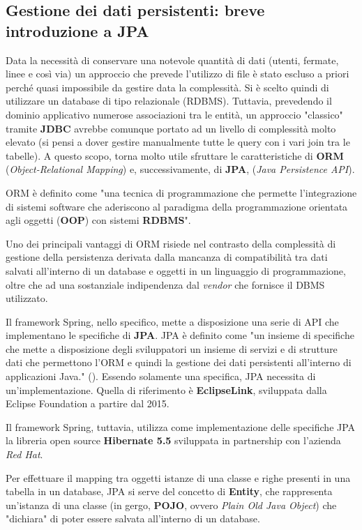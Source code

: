     \subsection{Gestione dei dati persistenti: breve introduzione a JPA}
        Data la necessità di conservare una notevole quantità di dati (utenti, fermate, linee e così via) un approccio che prevede l'utilizzo di file è stato escluso a priori perché quasi impossibile da gestire data la complessità. Si è scelto quindi di utilizzare un database di tipo relazionale (RDBMS). Tuttavia, prevedendo il dominio applicativo numerose associazioni tra le entità, un approccio "classico" tramite \textbf{JDBC} avrebbe comunque portato ad un livello di complessità molto elevato (si pensi a dover gestire manualmente tutte le query con i vari join tra le tabelle). A questo scopo, torna molto utile sfruttare le caratteristiche di \textbf{ORM} (\textit{Object-Relational Mapping}) e, successivamente, di \textbf{JPA}, (\textit{Java Persistence API}).
        
        ORM è definito come "una tecnica di programmazione che permette l'integrazione di sistemi software che aderiscono al paradigma della programmazione orientata agli oggetti (\textbf{OOP}) con sistemi \textbf{RDBMS}".

        Uno dei principali vantaggi di ORM risiede nel contrasto della complessità di gestione della persistenza derivata dalla mancanza di compatibilità tra dati salvati all'interno di un database e oggetti in un linguaggio di programmazione, oltre che ad una sostanziale indipendenza dal \textit{vendor} che fornisce il DBMS utilizzato. \cite{wiki:orm}
        
        Il framework Spring, nello specifico, mette a disposizione una serie di API che implementano le specifiche di \textbf{JPA}. JPA è definito come "un insieme di specifiche che mette a disposizione degli sviluppatori un insieme di servizi e di strutture dati che permettono l'ORM e quindi la gestione dei dati persistenti all'interno di applicazioni Java." (\cite{jpa}). Essendo solamente una specifica, JPA necessita di un'implementazione. Quella di riferimento è \textbf{EclipseLink}, sviluppata dalla Eclipse Foundation a partire dal 2015.

        Il framework Spring, tuttavia, utilizza come implementazione delle specifiche JPA la libreria open source \textbf{Hibernate 5.5} sviluppata in partnership con l'azienda \textit{Red Hat}. 

        Per effettuare il mapping tra oggetti istanze di una classe e righe presenti in una tabella in un database, JPA si serve del concetto di \textbf{Entity}, che rappresenta un'istanza di una classe (in gergo, \textbf{POJO}, ovvero \textit{Plain Old Java Object}) che "dichiara" di poter essere salvata all'interno di un database.

